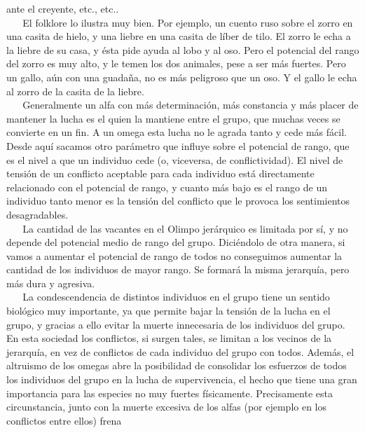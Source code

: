 ante el creyente, etc., etc..\\
\hspace*{0.333em} ~ ~ El folklore lo ilustra muy bien. Por ejemplo, un
cuento ruso sobre el zorro en una casita de hielo, y una liebre en una
casita de líber de tilo. El zorro le echa a la liebre de su casa, y ésta
pide ayuda al lobo y al oso. Pero el potencial del rango del zorro es
muy alto, y le temen los dos animales, pese a ser más fuertes. Pero un
gallo, aún con una guadaña, no es más peligroso que un oso. Y el gallo
le echa al zorro de la casita de la liebre.\\
\hspace*{0.333em} ~ ~ Generalmente un alfa con más determinación, más
constancia y más placer de mantener la lucha es el quien la mantiene
entre el grupo, que muchas veces se convierte en un fin. A un omega esta
lucha no le agrada tanto y cede más fácil. Desde aquí sacamos otro
parámetro que influye sobre el potencial de rango, que es el nivel a que
un individuo cede (o, viceversa, de conflictividad). El nivel de tensión
de un conflicto aceptable para cada individuo está directamente
relacionado con el potencial de rango, y cuanto más bajo es el rango de
un individuo tanto menor es la tensión del conflicto que le provoca los
sentimientos desagradables.\\
\hspace*{0.333em} ~ ~ La cantidad de las vacantes en el Olimpo
jerárquico es limitada por sí, y no depende del potencial medio de rango
del grupo. Diciéndolo de otra manera, si vamos a aumentar el potencial
de rango de todos no conseguimos aumentar la cantidad de los individuos
de mayor rango. Se formará la misma jerarquía, pero más dura y
agresiva.\\
\hspace*{0.333em} ~ ~ La condescendencia de distintos individuos en el
grupo tiene un sentido biológico muy importante, ya que permite bajar la
tensión de la lucha en el grupo, y gracias a ello evitar la muerte
innecesaria de los individuos del grupo. En esta sociedad los
conflictos, si surgen tales, se limitan a los vecinos de la jerarquía,
en vez de conflictos de cada individuo del grupo con todos. Además, el
altruismo de los omegas abre la posibilidad de consolidar los esfuerzos
de todos los individuos del grupo en la lucha de supervivencia, el hecho
que tiene una gran importancia para las especies no muy fuertes
físicamente. Precisamente esta circunstancia, junto con la muerte
excesiva de los alfas (por ejemplo en los conflictos entre ellos) frena

